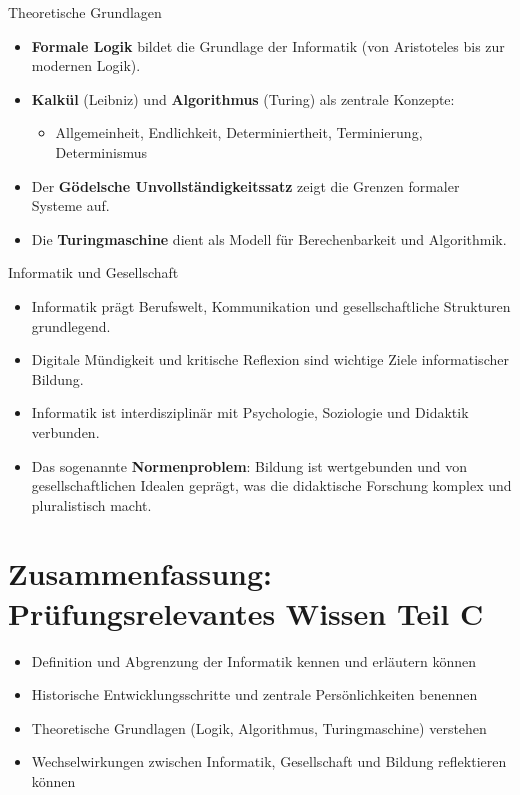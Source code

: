\documentclass{article}
\begin{document}
\begin{block}{Theoretische Grundlagen}
    \begin{itemize}
        \item \textbf{Formale Logik} bildet die Grundlage der Informatik (von Aristoteles bis zur modernen Logik).
        \item \textbf{Kalkül} (Leibniz) und \textbf{Algorithmus} (Turing) als zentrale Konzepte:
        \begin{itemize}
            \item Allgemeinheit, Endlichkeit, Determiniertheit, Terminierung, Determinismus
        \end{itemize}
        \item Der \textbf{Gödelsche Unvollständigkeitssatz} zeigt die Grenzen formaler Systeme auf.
        \item Die \textbf{Turingmaschine} dient als Modell für Berechenbarkeit und Algorithmik.
    \end{itemize}
\end{block}

\begin{block}{Informatik und Gesellschaft}
    \begin{itemize}
        \item Informatik prägt Berufswelt, Kommunikation und gesellschaftliche Strukturen grundlegend.
        \item Digitale Mündigkeit und kritische Reflexion sind wichtige Ziele informatischer Bildung.
        \item Informatik ist interdisziplinär mit Psychologie, Soziologie und Didaktik verbunden.
        \item Das sogenannte \textbf{Normenproblem}: Bildung ist wertgebunden und von gesellschaftlichen Idealen geprägt, was die didaktische Forschung komplex und pluralistisch macht.
    \end{itemize}
\end{block}

\section{Zusammenfassung: Prüfungsrelevantes Wissen Teil C}
\begin{itemize}
    \item Definition und Abgrenzung der Informatik kennen und erläutern können
    \item Historische Entwicklungsschritte und zentrale Persönlichkeiten benennen
    \item Theoretische Grundlagen (Logik, Algorithmus, Turingmaschine) verstehen
    \item Wechselwirkungen zwischen Informatik, Gesellschaft und Bildung reflektieren können
\end{itemize}
\end{document}
